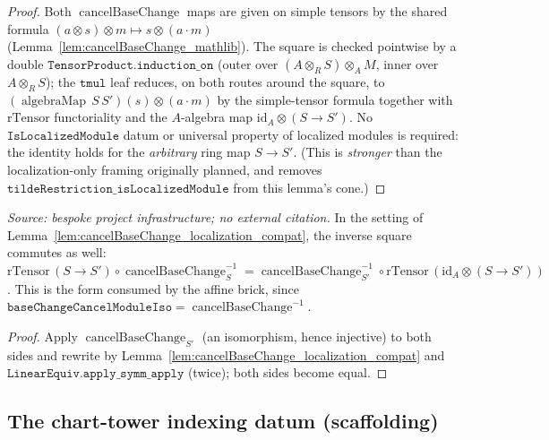 \begin{proof}
  \leanok
  Both \(\operatorname{cancelBaseChange}\) maps are given on simple tensors by the shared formula
  \((a \otimes s) \otimes m \mapsto s \otimes (a \cdot m)\) (Lemma~\ref{lem:cancelBaseChange_mathlib}).
  The square is checked pointwise by a double \(\mathtt{TensorProduct.induction\_on}\) (outer over
  \((A \otimes_R S) \otimes_A M\), inner over \(A \otimes_R S\)); the \(\mathtt{tmul}\) leaf
  reduces, on both routes around the square, to
  \((\operatorname{algebraMap}\,S\,S')(s) \otimes (a \cdot m)\) by the simple-tensor formula together
  with \(\mathrm{rTensor}\) functoriality and the \(A\)-algebra map \(\mathrm{id}_A \otimes (S\to S')\).
  No \(\mathtt{IsLocalizedModule}\) datum or universal property of localized modules is required: the
  identity holds for the \emph{arbitrary} ring map \(S \to S'\). (This is \emph{stronger} than the
  localization-only framing originally planned, and removes
  \(\mathtt{tildeRestriction\_isLocalizedModule}\) from this lemma's cone.)
\end{proof}

\begin{lemma}
  \label{lem:cancelBaseChange_localization_compat_symm}
  \textit{Source: bespoke project infrastructure; no external citation.}
  In the setting of Lemma~\ref{lem:cancelBaseChange_localization_compat}, the inverse square
  commutes as well:
  \(\mathrm{rTensor}\,(S \to S') \circ \operatorname{cancelBaseChange}_S^{-1}
   = \operatorname{cancelBaseChange}_{S'}^{-1} \circ \mathrm{rTensor}\,(\mathrm{id}_A \otimes (S \to S'))\).
  This is the form consumed by the affine brick, since
  \(\mathtt{baseChangeCancelModuleIso} = \operatorname{cancelBaseChange}^{-1}\).
\end{lemma}
\begin{proof}
  \leanok
  Apply \(\operatorname{cancelBaseChange}_{S'}\) (an isomorphism, hence injective) to both sides and
  rewrite by Lemma~\ref{lem:cancelBaseChange_localization_compat} and
  \(\mathtt{LinearEquiv.apply\_symm\_apply}\) (twice); both sides become equal.
\end{proof}

\subsection{The chart-tower indexing datum (scaffolding)}

